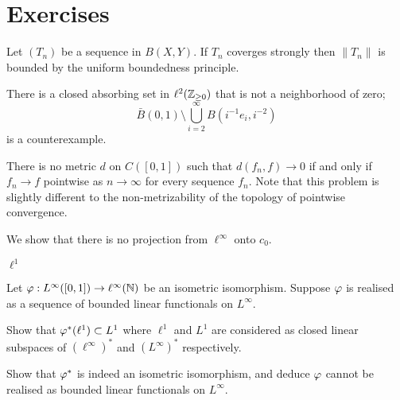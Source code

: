\documentclass{../../large}
\begin{document}
\section*{Exercises}

\begin{prb}
Let $(T_n)$ be a sequence in $B(X,Y)$.
If $T_n$ coverges strongly then $\|T_n\|$ is bounded by the uniform boundedness principle.
\end{prb}

\begin{prb}
There is a closed absorbing set in $\ell^2(\mathbb{Z}_{\ge0})$ that is not a neighborhood of zero;
\[\bar B(0,1)\setminus\bigcup_{i=2}^\infty B(i^{-1}e_i,i^{-2})\]
is a counterexample.
\end{prb}




\begin{prb}
There is no metric $d$ on $C([0,1])$ such that $d(f_n,f)\to0$ if and only if $f_n\to f$ pointwise as $n\to\infty$ for every sequence $f_n$.
Note that this problem is slightly different to the non-metrizability of the topology of pointwise convergence.
\end{prb}

\begin{prb}
We show that there is no projection from $\ell^\infty$ onto $c_0$.
\end{prb}

\begin{prb}
$\ell^1$
\end{prb}

\begin{prb}
Let $\varphi:L^\infty([0,1])\to\ell^\infty(\mathbb{N})$ be an isometric isomorphism.
Suppose $\varphi$ is realised as a sequence of bounded linear functionals on $L^\infty$.
\begin{parts}
\item
Show that $\varphi^*(\ell^1)\subset L^1$ where $\ell^1$ and $L^1$ are considered as closed linear subspaces of $(\ell^\infty)^*$ and $(L^\infty)^*$ respectively.
\item Show that $\varphi^*$ is indeed an isometric isomorphism, and deduce $\varphi$ cannot be realised as bounded linear functionals on $L^\infty$.
\end{parts}
\end{prb}
\end{document}
